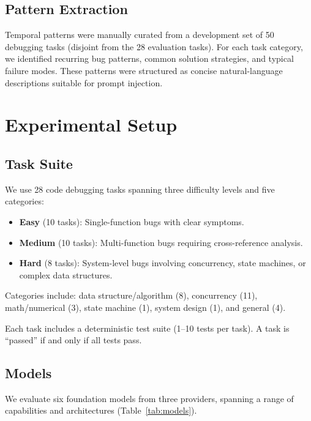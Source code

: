 \documentclass[11pt]{article}
\begin{document}
\subsection{Pattern Extraction}

Temporal patterns were manually curated from a development set of 50 debugging tasks (disjoint from the 28 evaluation tasks). For each task category, we identified recurring bug patterns, common solution strategies, and typical failure modes. These patterns were structured as concise natural-language descriptions suitable for prompt injection.

\section{Experimental Setup}
\label{sec:setup}

\subsection{Task Suite}

We use 28 code debugging tasks spanning three difficulty levels and five categories:
\begin{itemize}[nosep]
    \item \textbf{Easy} (10 tasks): Single-function bugs with clear symptoms.
    \item \textbf{Medium} (10 tasks): Multi-function bugs requiring cross-reference analysis.
    \item \textbf{Hard} (8 tasks): System-level bugs involving concurrency, state machines, or complex data structures.
\end{itemize}

\noindent Categories include: data structure/algorithm (8), concurrency (11), math/numerical (3), state machine (1), system design (1), and general (4).

Each task includes a deterministic test suite (1--10 tests per task). A task is ``passed'' if and only if all tests pass.

\subsection{Models}

We evaluate six foundation models from three providers, spanning a range of capabilities and architectures (Table~\ref{tab:models}).
\end{document}
